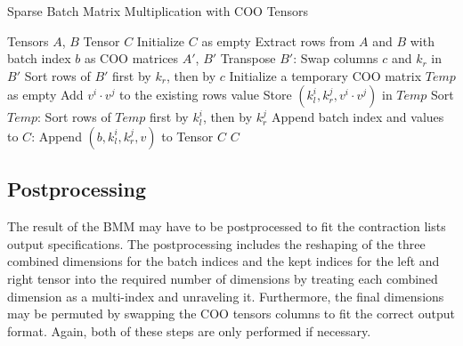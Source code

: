 \begin{algorithm}[H]
    \caption{Sparse Batch Matrix Multiplication with COO Tensors}
    \label{alg:bmm}
    \begin{algorithmic}[1]
        \REQUIRE Tensors $A$, $B$
        \ENSURE Tensor $C$
        \STATE Initialize $C$ as empty
        \STATE Extract rows from $A$ and $B$ with batch index $b$ as COO matrices $A'$, $B'$
        \STATE Transpose $B'$:
        \STATE Swap columns $c$ and $k_r$ in $B'$
        \STATE Sort rows of $B'$ first by $k_r$, then by $c$
        \STATE Initialize a temporary COO matrix $Temp$ as empty
        \STATE Add $v^i \cdot v^j$ to the existing rows value
        \ELSE
        \STATE Store $(k_l^i, k_r^j, v^i \cdot v^j)$ in $Temp$
        \ENDIF
        \ENDFOR
        \ENDFOR
        \STATE Sort $Temp$:
        \STATE Sort rows of $Temp$ first by $k_l^i$, then by $k_r^j$
        \STATE Append batch index and values to $C$:
        \STATE Append $(b, k_l^i, k_r^j, v)$ to Tensor $C$
        \ENDFOR
        \ENDFOR
        \RETURN $C$
    \end{algorithmic}
\end{algorithm}

\subsection{Postprocessing}
The result of the BMM may have to be postprocessed to fit the contraction lists output
specifications. The postprocessing includes the reshaping of the three combined dimensions for
the batch indices and the kept indices for the left and right tensor into the required number of dimensions by treating
each combined dimension as a multi-index and unraveling it. Furthermore, the final dimensions
may be permuted by swapping the COO tensors columns to fit the correct output format. Again,
both of these steps are only performed if necessary.

